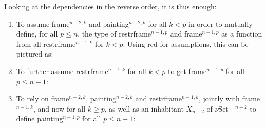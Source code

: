 \documentclass[a4paper,english,cleveref,autoref,thm-restate]{article}
\begin{document}
Looking at the dependencies in the reverse order, it is thus enough:
\begin{enumerate}
\item To assume frame$^{n-2,k}$ and painting$^{n-2,k}$ for all $k< p$
  in order to mutually define, for all $p\leq n$, the type of
  restrframe$^{n-1,p}$ and frame$^{n-1,p}$ as a function from all
  restrframe$^{n-1,k}$ for $k< p$. Using red for assumptions, this
  can be pictured as:
\begin{center}
\end{center}

\item To further assume restrframe$^{n-1,k}$ for all $k<p$ to get
  frame$^{n-1,p}$ for all $p\leq n-1$:
\begin{center}
\end{center}

\item To rely on frame$^{n-2,k}$, painting$^{n-2,k}$ and
  restrframe$^{n-1,k}$, jointly with frame$^{n-1,k}$, and now for all
  $k \geq p$, as well as an inhabitant $X_{n-2}$ of $\nu$Set$^{=n-2}$
  to define painting$^{n-1,p}$ for all $p \leq n-1$:
\begin{center}
\end{center}


\end{enumerate}
\end{document}
